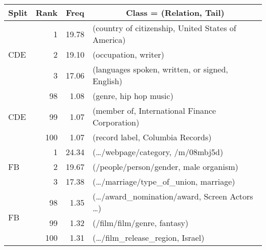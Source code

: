 \begin{tabular}{| l | r | r | l |}
    \hline
    
    \multicolumn{1}{|c|}{\textbf{Split}} &
    \multicolumn{1}{|c|}{\textbf{Rank}} &
    \multicolumn{1}{|c|}{\textbf{Freq}} &
    \multicolumn{1}{|c|}{\textbf{Class = (Relation, Tail)}} \\

    \hline \hline

    \multirow{3}{*}{CDE}
    & 1   & 19.78 & (country of citizenship, United States of America)   \\
    & 2   & 19.10 & (occupation, writer)                                 \\
    & 3   & 17.06 & (languages spoken, written, or signed, English)      \\

    \hline

    \multirow{3}{*}{CDE}
    & 98  & 1.08  & (genre, hip hop music)                               \\
    & 99  & 1.07  & (member of, International Finance Corporation)       \\
    & 100 & 1.07  & (record label, Columbia Records)                     \\

    \hline \hline

    \multirow{3}{*}{FB}
    & 1   & 24.34 & (\dots/webpage/category, /m/08mbj5d)                 \\
    & 2   & 19.67 & (/people/person/gender, male organism)               \\
    & 3   & 17.38 & (\dots/marriage/type\_of\_union, marriage)           \\

    \hline

    \multirow{3}{*}{FB}
    & 98  & 1.35  & (\dots/award\_nomination/award, Screen Actors \dots) \\
    & 99  & 1.32  & (/film/film/genre, fantasy)                          \\
    & 100 & 1.31  & (\dots/film\_release\_region, Israel)                \\

    \hline
\end{tabular}
